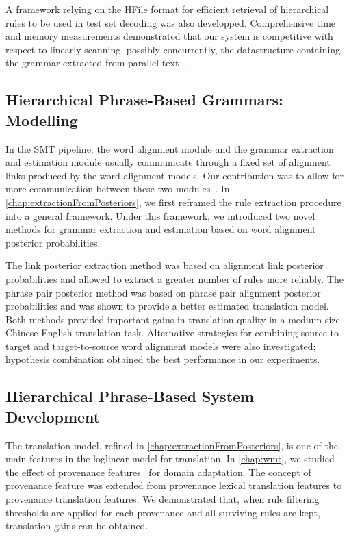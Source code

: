 A framework relying on the HFile format
for efficient retrieval of hierarchical rules to
be used in test set decoding was also developped.
Comprehensive time and memory measurements demonstrated
that our system is competitive with respect to linearly
scanning, possibly concurrently, the datastructure containing
the grammar extracted from parallel
text~\citep{pino-waite-byrne:2012:PBML}.

\subsection{Hierarchical Phrase-Based Grammars: Modelling}

In the SMT pipeline, the word alignment module and
the grammar extraction and estimation module usually
communicate through a fixed set of alignment links
produced by the word alignment models. Our contribution
was to allow for more communication between these two
modules~\citep{degispert-pino-byrne:2010:EMNLP}.
In \autoref{chap:extractionFromPosteriors}, we
first reframed the rule extraction procedure
into a general framework. Under this framework, we
introduced two novel methods for grammar extraction
and estimation based on word alignment posterior
probabilities.

The link posterior extraction method was based on alignment
link posterior probabilities and allowed to extract
a greater number of rules more reliably. The phrase pair
posterior method was based on phrase pair alignment posterior
probabilities and was shown to provide a better estimated
translation model. Both methods provided important gains in
translation quality in
a medium size Chinese-English translation task.
Alternative strategies for combining source-to-target
and target-to-source word alignment models were also
investigated; hypothesis combination obtained the best
performance in our experiments.

\subsection{Hierarchical Phrase-Based System Development}

The translation model, refined in \autoref{chap:extractionFromPosteriors},
is one of the main features in the loglinear model for translation.
In \autoref{chap:wmt}, we studied the effect of provenance
features~\citep{chiang-deneefe-pust:2011:ACL} for domain adaptation.
The concept of provenance feature was extended from provenance lexical translation
features to provenance translation features. We demonstrated that,
when rule filtering thresholds are applied for each provenance and all
surviving rules are kept, translation gains can be obtained.

